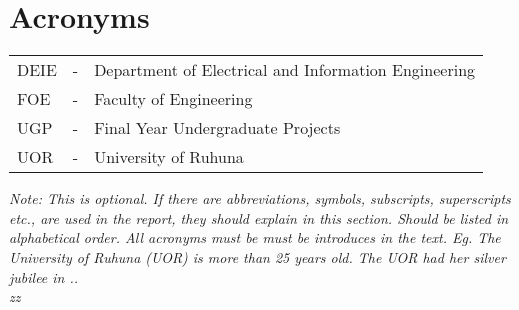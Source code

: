 \tableofcontents

\chapter*{Acronyms}


\noindent \begin{tabular}{lcl}
DEIE	& - & Department of Electrical and Information Engineering\\
FOE	& - & Faculty of Engineering\\
UGP	& - & Final Year Undergraduate Projects \\
UOR	& - & University of Ruhuna
\end{tabular} 

\vspace{0.5in}

\textit{Note: This is optional. If there are abbreviations, symbols, subscripts, superscripts etc., are used in the report, they should explain in this section. Should be listed in alphabetical order. All acronyms must be must be introduces in the text. Eg. The University of Ruhuna (UOR) is more than 25 years old. The UOR had her silver jubilee in ..\\
zz}


\listoftables
\listoffigures

\newpage